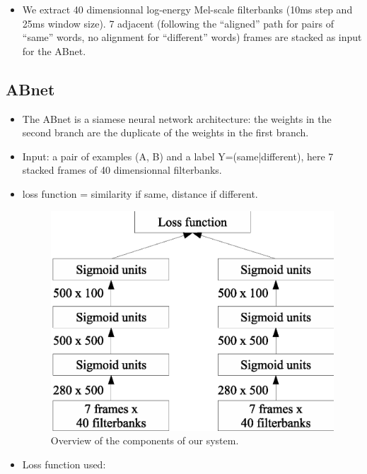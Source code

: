 \documentclass[final]{beamer}
\newcommand{\abnet}{{\sc ABnet}}
\begin{document}
\begin{frame}[t]
\begin{multicols}{3}
\begin{itemize}
\item We extract 40 dimensionnal log-energy Mel-scale filterbanks (10ms step and 25ms window size). 7 adjacent (following the ``aligned'' path for pairs of ``same'' words, no alignment for ``different'' words) frames are stacked as input for the \abnet{}.
\end{itemize}

\vfill
\columnbreak

\subsection{ABnet}

\begin{itemize}
\item The \abnet{} is a siamese neural network architecture: the weights in the second branch are the duplicate of the weights in the first branch.
\item Input: a pair of examples (A, B) and a label Y=(same|different), here 7 stacked frames of 40 dimensionnal filterbanks.
\item loss function = similarity if same, distance if different.

\vspace{1cm}
\begin{figure}[ht!]
  \begin{center}
    \includegraphics[width=0.85\columnwidth]{abnet}
    \caption{\label{fig:system}Overview of the components of our system.}
  \end{center}
\end{figure}

\item Loss function used:


\end{itemize}
\end{multicols}
\end{frame}
\end{document}
